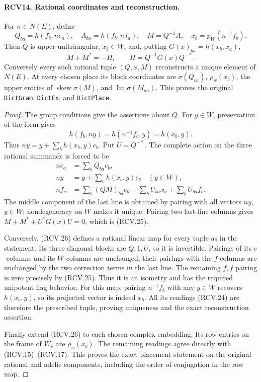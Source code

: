 \documentclass[11pt,a4paper]{article}
\numberwithin{equation}{section}
\theoremstyle{remark}\newtheorem{remark}[theorem]{Remark}
\begin{document}
\paragraph{RCV14. Rational coordinates and reconstruction.}
\label{claim:RCV14}
For \(n\in N(E)\), define
\[
 Q_{ba}=h(f_b,ne_a),\quad A_{ba}=h(f_b,nf_a),\quad
 M=Q^{-1}A,\quad x_b=p_W(n^{-1}f_b).
\tag{RCV.24}
\]
Then \(Q\) is upper unitriangular, \(x_b\in W\), and, putting
\(G(x)_{ba}=h(x_b,x_a)\),
\[
               M+M^*=-H,\qquad H=Q^{-1}G(x)Q^{-*}.
\tag{RCV.25}
\]
Conversely every such rational tuple \((Q,x,M)\) reconstructs a
unique element of \(N(E)\).  At every chosen place its block
coordinates are \(\sigma(Q_{ba})\), \(\rho_w(x_b)\), the
upper entries of \(\operatorname{skew}\sigma(M)\), and
\(\operatorname{Im}\sigma(M_{aa})\).
This proves the original \texttt{Dict\allowbreak Gram}, \texttt{Dict\allowbreak Ex}, and
\texttt{Dict\allowbreak Place}.
\begin{proof}
The group conditions give the assertions about \(Q\).  For
\(y\in W\), preservation of the form gives
\[
 h(f_b,ny)=h(n^{-1}f_b,y)=h(x_b,y).
\]
Thus \(ny=y+\sum_bh(x_b,y)e_b\).  Put \(U=Q^{-*}\).
The complete action on the three rational summands is forced to be
\[
 \begin{split}
 ne_a&=\sum_b Q_{ba}e_b,\\
 ny&=y+\sum_b h(x_b,y)e_b\quad(y\in W),\\
 nf_a&=\sum_b(QM)_{ba}e_b
                         -\sum_b U_{ba}x_b+\sum_b U_{ba}f_b.
 \end{split}
\tag{RCV.26}
\]
The middle component of the last line is obtained by pairing with
all vectors \(ny\), \(y\in W\); nondegeneracy on \(W\)
makes it unique.  Pairing two last-line columns gives
\(M+M^*+U^*G(x)U=0\), which is (RCV.25).

Conversely, (RCV.26) defines a rational linear map for every tuple
as in the statement.  Its three diagonal blocks are \(Q,1,U\),
so it is invertible.  Pairings of its \(e\)-columns and its
\(W\)-columns are unchanged; their pairings with the \(f\)-columns
are unchanged by the two correction terms in the last line.
The remaining \(f,f\) pairing is zero precisely by (RCV.25).
Thus it is an isometry and has the required unipotent flag behavior.
For this map, pairing \(n^{-1}f_b\) with any \(y\in W\)
recovers \(h(x_b,y)\), so its projected vector is indeed \(x_b\).
All its readings (RCV.24) are therefore the prescribed tuple, proving
uniqueness and the exact reconstruction assertion.

Finally extend (RCV.26) to each chosen complex embedding.  Its row
entries on the frame of \(W_v\) are \(\rho_w(x_b)\).
The remaining readings agree directly with (RCV.15)--(RCV.17).
This proves the exact placement statement on the original rational
and adelic components, including the order of conjugation in the
row map.
\end{proof}
\end{document}
